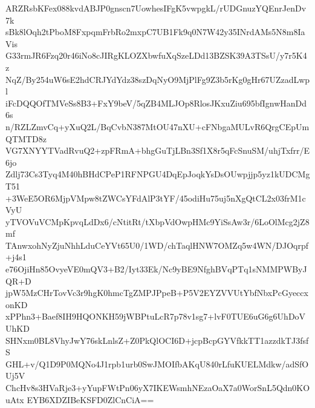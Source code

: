 ARZRsbKFex088kvdABJP0gnscn7UowhesIFgK5vwpgkL/rUDGnuzYQEnrJenDv7k
sBk8lOqh2tPboM8FxpqmFrbRo2mxpC7UB1Fk9q0N7W42y35INrdAMs5N8m8IaVis
G33rmJR6Fzq20r46iNo8cJIRgKLOZXbwfuXqSzeLDd13BZSK39A3TSsU/y7r5K4z
NqZ/By254uW6sE2hdCRJYdYdz38szDqNyO9MjPlFg9Z3b5rKg0gHr67UZzadLwpl
iFcDQQOfTMVeSs8B3+FxY9beV/5qZB4MLJOp8RlosJKxuZiu695bfIgnwHanDd6s
n/RZLZmvCq+yXuQ2L/BqCvbN387MtOU47nXU+cFNbgaMULvR6QrgCEpUmQTMTD8z
VG7XNYYTVadRvuQ2+zpFRmA+bhgGuTjLBn3Sf1X8r5qFcSnuSM/uhjTxfrr/E6jo
Zdlj73Cs3Tyq4M40hBHdCPeP1RFNPGU4DqEpJoqkYsDsOUwpjjp5yz1kUDCMgT51
+3WeE5OR6MjpVMpw8tZWCsYFdAlP3tYF/45odiHu75uj5nXgQtCL2x03frM1cVyU
yTVOVuVCMpKpvqLdDx6/cNtitRt/tXbpVdOwpHMc9YiSsAw3r/6LoOlMcg2jZ8mf
TAnwxohNyZjuNhhLduCeYVt65U0/1WD/chTaqlHNW7OMZq5w4WN/DJOqrpf+j4s1
e76OjiHn85OvyeVE0mQV3+B2/Iyt33Ek/Nc9yBE9NfghBVqPTq1sNMMPWByJQR+D
jpW5MzCHrTovVc3r9hgK0hmcTgZMPJPpeB+P5V2EYZVVUtYbfNbxPcGyeccxonKD
xPPhn3+Baef8IH9HQONKH59jWBPtuLcR7p78v1sg7+lvF0TUE6uG6g6UhDoVUhKD
SHNxm0BL8VhyJwY76skLnlsZ+Z0PkQlOCI6D+jcpBcpGYVfkkTT1azzdkTJ3fsfS
GHL+v/Q1D9P0MQNo4J1rpb1urb0SwJMOIfbAKqU840rLfuKUELMdkw/adSfOUj5V
ChcHv8s3HVaRje3+yYupFWtPn06yX7IKEWsmhNEzaOaX7a0WorSnL5Qdn0KOuAtx
EYB6XDZIBeKSFD0ZlCnCiA==
